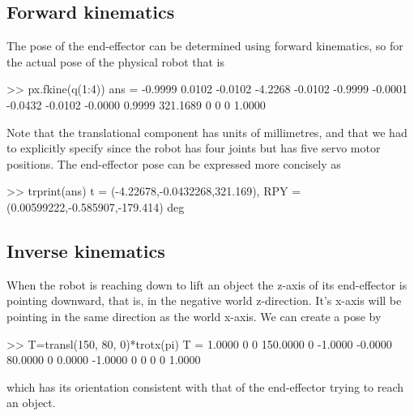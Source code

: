 \documentclass[11pt]{article}
\begin{document}
\subsection{Forward kinematics}
The pose of the end-effector can be determined using forward kinematics, so for the actual pose of the physical robot
that is
\begin{Code}
>> px.fkine(q(1:4))
ans =
   -0.9999    0.0102   -0.0102   -4.2268
   -0.0102   -0.9999   -0.0001   -0.0432
   -0.0102   -0.0000    0.9999  321.1689
         0         0         0    1.0000
\end{Code}
Note that the translational component has units of millimetres, and that we had to explicitly specify  since the 
robot has four joints but  has five servo motor positions.
The end-effector pose can be expressed more concisely as
\begin{Code}
>> trprint(ans)
t = (-4.22678,-0.0432268,321.169), RPY = (0.00599222,-0.585907,-179.414) deg
\end{Code}


\subsection{Inverse kinematics}
When the robot is reaching down to lift an object the z-axis of its end-effector is pointing downward, that is, in the
negative world z-direction.  It's x-axis will be pointing in the same direction as the world x-axis.
We can create a pose by
\begin{Code}
>> T=transl(150, 80, 0)*trotx(pi)
T =
    1.0000         0         0  150.0000
         0   -1.0000   -0.0000   80.0000
         0    0.0000   -1.0000         0
         0         0         0    1.0000
\end{Code}
which has its orientation consistent with that of the end-effector trying to reach an object.
\end{document}
